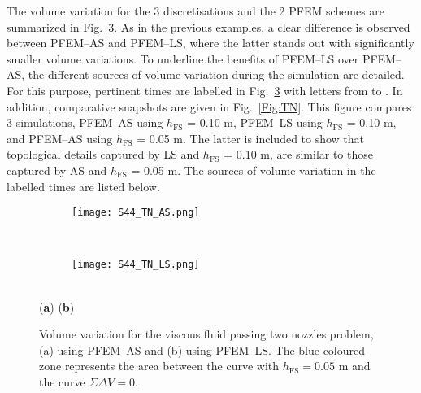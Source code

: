 \documentclass[final,3p,times]{elsarticle}
\newcommand*\circled[1]{\tikz[baseline=(char.base)]{
            \node[shape=circle,draw,inner sep=0.5pt,draw=blue2,line width=0.5mm] (char) {#1};}}
\begin{document}
The volume variation for the 3 discretisations and the 2 PFEM schemes are summarized in Fig.~\ref{Fig:TN_g}. As in the previous examples, a clear difference is observed between PFEM--AS and PFEM--LS, where the latter stands out with significantly smaller volume variations. To underline the benefits of PFEM--LS over PFEM--AS, the different sources of volume variation during the simulation are detailed. For this purpose, pertinent times are labelled in Fig.~\ref{Fig:TN_g} with letters from \circled{A} to \circled{D}. In addition, comparative snapshots are given in Fig.~\ref{Fig:TN}. This figure compares 3 simulations, PFEM--AS using $h_\mathrm{FS}$ = 0.10 m, PFEM--LS using $h_\mathrm{FS}$ = 0.10 m, and PFEM--AS using $h_\mathrm{FS}$ = 0.05 m. The latter is included to show that topological details captured by LS and $h_\mathrm{FS}$ = 0.10 m, are similar to those captured by AS and $h_\mathrm{FS}$ = 0.05 m. The sources of volume variation in the labelled times are listed below.

\begin{figure}[h!]
\captionsetup[subfigure]{labelformat=empty}
\centering 
	\begin{subfigure}[b]{0.48\textwidth}
		\texttt{[image: S44\_TN\_AS.png]}
		\caption{}
		\label{Fig:TN_g_a}
	\end{subfigure}
	~\hspace{4mm}
	\begin{subfigure}[b]{0.48\textwidth}	
		\texttt{[image: S44\_TN\_LS.png]}
		\caption{}
		\label{Fig:TN_g_b}
	\end{subfigure}
	\\
	\vspace{-100mm}
	\hspace{-77mm} \footnotesize{(\textbf{a})} \hspace{80mm} (\textbf{b}) 
	\\
	\vspace{91mm}
\caption{Volume variation for the viscous fluid passing two nozzles problem, (a) using PFEM--AS and (b) using PFEM--LS. The blue coloured zone represents the area between the curve with $h_\mathrm{FS}=0.05$ m and the curve $\Sigma\Delta V = 0$.}
\label{Fig:TN_g}
\end{figure}
\end{document}
